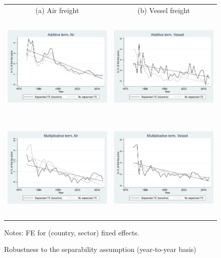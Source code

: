 \documentclass[a4paper,11pt]{article}
\begin{document}
\begin{figure}[htbp]
\caption{Robustness to the separability assumption (year-to-year basis)}
\label{fig:robustesse_non_separe}
\begin{center}
\begin{tabular}{cc}
{\small (a) Air freight} & {\small (b) Vessel freight}\\
\includegraphics[width=3in, height=2in]{graph_robustesse_ns_mp_terme_A_air.pdf}
& \includegraphics[width=3in,height=2in]{graph_robustesse_ns_mp_terme_A_ves.pdf} \\
\includegraphics[width=3in, height=2in]{graph_robustesse_ns_mp_terme_I_air.pdf}
& \includegraphics[width=3in,height=2in]{graph_robustesse_ns_mp_terme_I_ves.pdf} \\

\end{tabular}
\end{center}
\begin{minipage} [c]  {5in} \scriptsize%
Notes: FE for (country, sector) fixed effects.
\end{minipage}
\end{figure}
\end{document}

